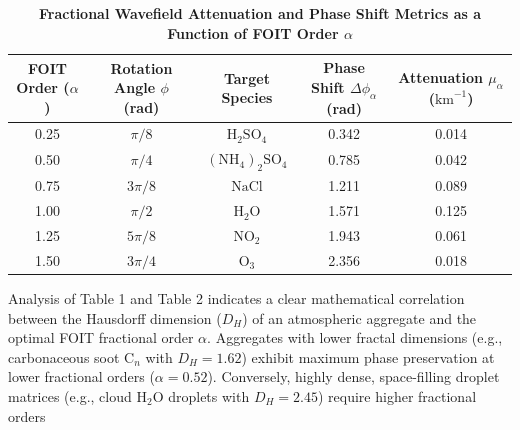 \documentclass{article}
\begin{document}
\begin{table}[h!]
\centering
\caption{\textbf{Fractional Wavefield Attenuation and Phase Shift Metrics as a Function of FOIT Order $\alpha$}}
\vspace{0.3cm}
\begin{tabular}{|c|c|c|c|c|}
\hline
\textbf{FOIT Order ($\alpha$)} & \textbf{Rotation Angle $\phi$ (rad)} & \textbf{Target Species} & \textbf{Phase Shift $\Delta \phi_{\alpha}$ (rad)} & \textbf{Attenuation $\mu_{\alpha}$ ($\text{km}^{-1}$)} \\ \hline
0.25 & $\pi / 8$ & $\text{H}_2\text{SO}_4$ & 0.342 & 0.014 \\ \hline
0.50 & $\pi / 4$ & $(\text{NH}_4)_2\text{SO}_4$ & 0.785 & 0.042 \\ \hline
0.75 & $3\pi / 8$ & $\text{NaCl}$ & 1.211 & 0.089 \\ \hline
1.00 & $\pi / 2$ & $\text{H}_2\text{O}$ & 1.571 & 0.125 \\ \hline
1.25 & $5\pi / 8$ & $\text{NO}_2$ & 1.943 & 0.061 \\ \hline
1.50 & $3\pi / 4$ & $\text{O}_3$ & 2.356 & 0.018 \\ \hline
\end{tabular}
\end{table}

Analysis of Table 1 and Table 2 indicates a clear mathematical correlation between the Hausdorff dimension ($D_H$) of an atmospheric aggregate and the optimal FOIT fractional order $\alpha$. Aggregates with lower fractal dimensions (e.g., carbonaceous soot $\text{C}_n$ with $D_H = 1.62$) exhibit maximum phase preservation at lower fractional orders ($\alpha = 0.52$). Conversely, highly dense, space-filling droplet matrices (e.g., cloud $\text{H}_2\text{O}$ droplets with $D_H = 2.45$) require higher fractional orders

\end{document}
